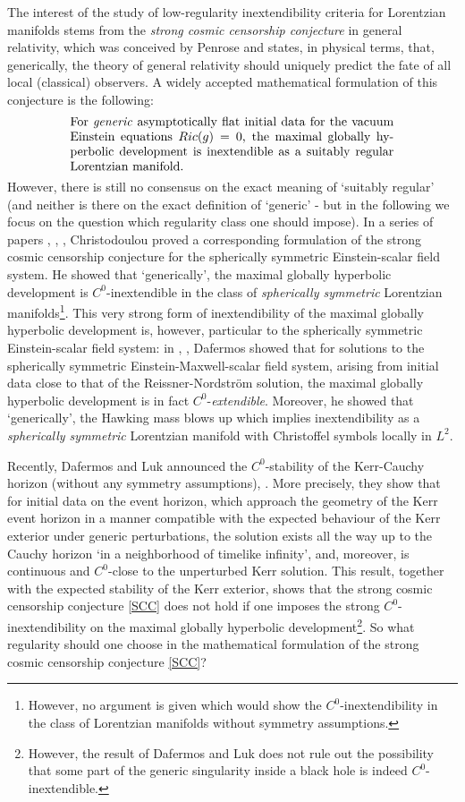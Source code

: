 \documentclass[reqno]{article}
\begin{document}
The interest of the study of low-regularity inextendibility criteria for Lorentzian manifolds stems from the \emph{strong cosmic censorship conjecture} in general relativity, which was conceived by Penrose and states, in physical terms, that, generically, the theory of general relativity should uniquely predict the fate of all local (classical) observers. A widely accepted mathematical formulation of this conjecture is the following: 
\begin{equation}
\label{SCC}
\parbox{0.75\textwidth}{
For \emph{generic} asymptotically flat initial data for the vacuum Einstein equations $Ric(g) = 0$, the maximal globally hyperbolic development is inextendible as a suitably regular Lorentzian manifold.}
\end{equation} 
However, there is still no consensus on the exact meaning of `suitably regular' (and neither is there on the exact definition of `generic' - but in the following we focus on the question which regularity class one should impose).
In a series of papers \cite{Chris91}, \cite{Chris93}, \cite{Chris99}, Christodoulou proved a corresponding formulation of the strong cosmic censorship conjecture for the spherically symmetric Einstein-scalar field system. He showed that `generically', the maximal globally hyperbolic development is $C^0$-inextendible in the class of \emph{spherically symmetric} Lorentzian manifolds\footnote{However, no argument is given which would show the $C^0$-inextendibility in the class of Lorentzian manifolds without symmetry assumptions.}. This very strong form of inextendibility of the maximal globally hyperbolic development is, however, particular to the spherically symmetric Einstein-scalar field system: in \cite{Daf03}, \cite{Daf05a}, Dafermos showed that for solutions to the spherically symmetric Einstein-Maxwell-scalar field system, arising from initial data close to that of the Reissner-Nordstr\"om solution,  the maximal globally hyperbolic development is in fact $C^0$-\emph{extendible}. Moreover, he showed that `generically', the Hawking mass blows up which implies inextendibility as a \emph{spherically symmetric} Lorentzian manifold with Christoffel symbols locally in $L^2$. 

Recently, Dafermos and Luk announced the $C^0$-stability of the Kerr-Cauchy horizon (without any symmetry assumptions), \cite{DafLuk}. More precisely, they show that for initial data on the event horizon, which approach the geometry of the Kerr event horizon in a manner compatible with the expected behaviour of the Kerr exterior under generic perturbations, the solution exists all the way up to the Cauchy horizon `in a neighborhood of timelike infinity', and, moreover, is continuous and $C^0$-close to the unperturbed Kerr solution.  
This result, together with the expected stability of the Kerr exterior, shows that the strong cosmic censorship conjecture \eqref{SCC} does not hold if one imposes the strong $C^0$-inextendibility on the maximal globally hyperbolic development\footnote{However, the result of Dafermos and Luk does not rule out the possibility that some part of the generic singularity inside a black hole is indeed $C^0$-inextendible.}. So what regularity should one choose in the mathematical formulation of the strong cosmic censorship conjecture \eqref{SCC}?
\end{document}
